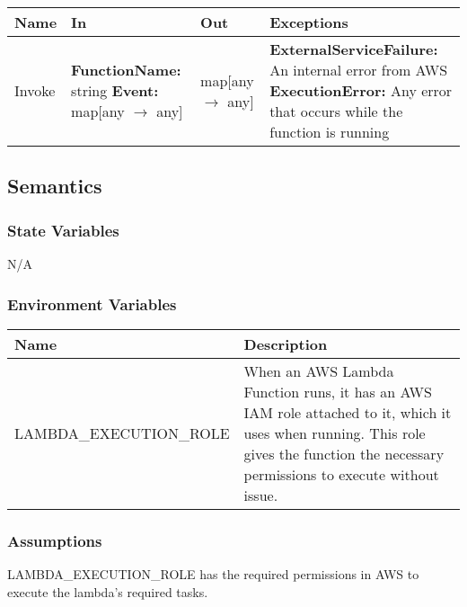 \documentclass[12pt, titlepage]{article}
\begin{document}
\begin{center}
  \begin{tabular}{>{\raggedright}p{3cm} >{\raggedright}p{5cm}
    >{\raggedright}p{4cm} p{4cm}}
    \hline
    \textbf{Name} & \textbf{In} & \textbf{Out} & \textbf{Exceptions} \\
    \hline
    Invoke & \textbf{FunctionName:} string \newline \textbf{Event:}
    map[any $\rightarrow$ any] & map[any $\rightarrow$ any] &
    \textbf{ExternalServiceFailure:} An internal error from AWS
    \newline \textbf{ExecutionError:} Any error that occurs while the
    function is running \\
    \hline
  \end{tabular}
\end{center}

\subsection{Semantics}

\subsubsection{State Variables}

N/A

\subsubsection{Environment Variables}

\begin{center}
  \begin{tabular}{p{6cm} p{10cm}}
    \hline
    \textbf{Name} & \textbf{Description} \\
    \hline
    LAMBDA\_EXECUTION\_ROLE & When an AWS Lambda Function runs, it
    has an AWS IAM role attached to it, which it uses when running.
    This role gives the function the necessary permissions to execute
    without issue. \\
    \hline
  \end{tabular}
\end{center}

\subsubsection{Assumptions}

LAMBDA\_EXECUTION\_ROLE has the required permissions in AWS to
execute the lambda's required tasks.
\end{document}
